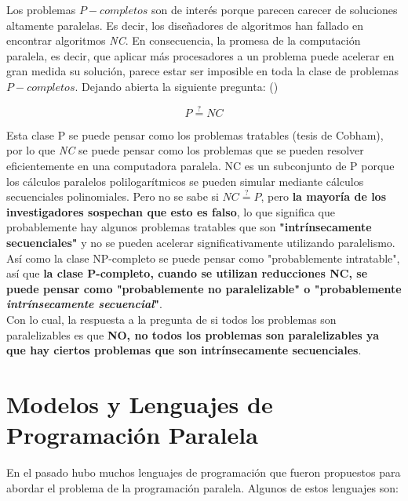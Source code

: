 Los problemas $P-completos$ son de interés porque parecen carecer de soluciones altamente paralelas. Es decir, los
diseñadores de algoritmos han fallado en encontrar algoritmos \textit{NC}. En consecuencia, la promesa de la computación
paralela, es decir, que aplicar más procesadores a un problema puede acelerar en gran medida su solución, parece estar
ser imposible en toda la clase de problemas $P-completos$. Dejando abierta la siguiente pregunta:
(\textcite{greenlaw1995})

\[
  P \stackrel{?}{=} NC
\]

Esta clase P se puede pensar como los problemas tratables (tesis de Cobham), por lo que \textit{NC} se puede pensar como
los problemas que se pueden resolver eficientemente en una computadora paralela. NC es un subconjunto de P porque los
cálculos paralelos polilogarítmicos se pueden simular mediante cálculos secuenciales polinomiales. Pero no se sabe si
$NC \stackrel{?}{=} P$, pero \textbf{la mayoría de los investigadores sospechan que esto es falso}, lo que significa que
probablemente hay algunos problemas tratables que son \textbf{"intrínsecamente secuenciales"} y no se pueden acelerar
significativamente utilizando paralelismo. Así como la clase NP-completo se puede pensar como "probablemente
intratable", así que \textbf{la clase P-completo, cuando se utilizan reducciones NC, se puede pensar como "probablemente
no paralelizable" o "probablemente \textit{intrínsecamente secuencial}"}. \\

Con lo cual, la respuesta a la pregunta de si todos los problemas son paralelizables es que \textbf{NO, no todos los
problemas son paralelizables ya que hay ciertos problemas que son intrínsecamente secuenciales}.

\section*{Modelos y Lenguajes de Programación Paralela}

En el pasado hubo muchos lenguajes de programación que fueron propuestos para abordar el problema de la programación
paralela. Algunos de estos lenguajes son:

